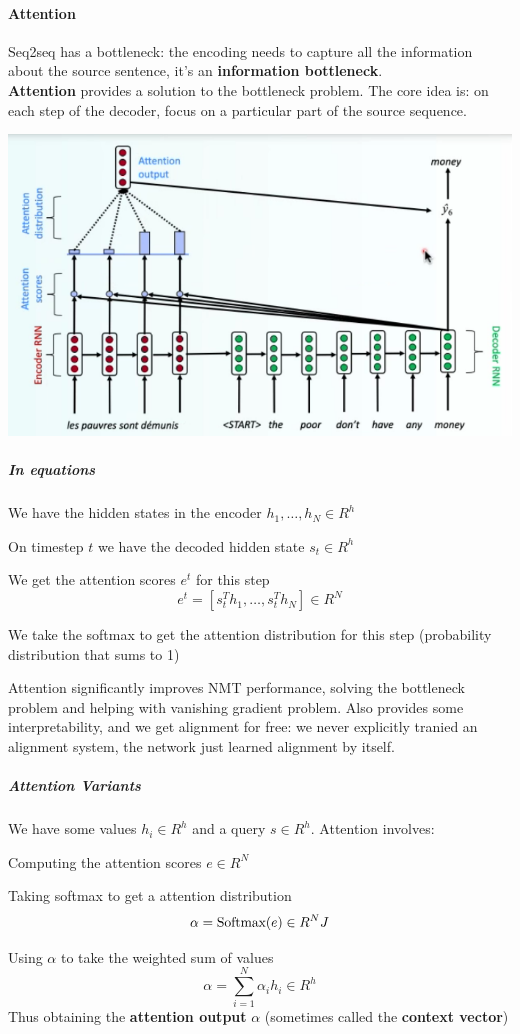 \documentclass[10pt]{report}
\begin{document}
\paragraph{Attention} Seq2seq has a bottleneck: the encoding needs to capture all the information about the source sentence, it's an \textbf{information bottleneck}.\\
\textbf{Attention} provides a solution to the bottleneck problem. The core idea is: on each step of the decoder, focus on a particular part of the source sequence.
\begin{center}
	\includegraphics[scale=0.6]{67.png}
\end{center}
\subparagraph{In equations}\begin{list}{}{}
	\item We have the hidden states in the encoder $h_1,\ldots,h_N\in R^h$
	\item On timestep $t$ we have the decoded hidden state $s_t \in R^h$
	\item We get the attention scores $e^t$ for this step 
	$$e^t=[s_t^Th_1,\ldots,s_t^Th_N]\in R^N$$
	\item We take the softmax to get the attention distribution for this step (probability distribution that sums to 1)
	\item %
\end{list}
Attention significantly improves NMT performance, solving the bottleneck problem and helping with vanishing gradient problem. Also provides some interpretability, and we get alignment for free: we never explicitly tranied an alignment system, the network just learned alignment by itself.
\subparagraph{Attention Variants} We have some values $h_i\in R^h$ and a query $s\in R^h$. Attention involves:
\begin{list}{}{}
	\item Computing the attention scores $e\in R^N$
	\item Taking softmax to get a attention distribution
	$$\alpha=\hbox{Softmax}(e) \in R^NJ$$
	\item Using $\alpha$ to take the weighted sum of values
	$$\alpha = \sum_{i=1}^N\alpha_ih_i\in R^h$$
	Thus obtaining the \textbf{attention output} $\alpha$ (sometimes called the \textbf{context vector})
\end{list}
\end{document}
